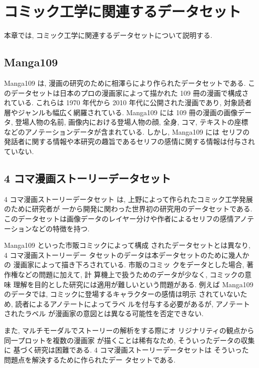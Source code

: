 \newpage
\changeindent{0cm}
\section{コミック工学に関連するデータセット}
\changeindent{2cm}

本章では, コミック工学に関連するデータセットについて説明する.

\changeindent{0cm}
\subsection{Manga109}
\changeindent{2cm}

Manga109 \cite{mtap_matsui_2017} は,
漫画の研究のために相澤らにより作られたデータセットである. このデータセットは日本のプロの漫画家によって描かれた 109 冊の漫画で構成されている. これらは 1970 年代から 2010 年代に公開された漫画であり, 対象読者層やジャンルも幅広く網羅されている. Manga109 には 109 冊の漫画の画像データ, 登場人物の名前, 画像内における登場人物の顔, 全身, コマ, テキストの座標などのアノテーションデータが含まれている.
しかし, Manga109 には
セリフの発話者に関する情報や本研究の趣旨であるセリフの感情に関する情報は付与されていない.

\changeindent{0cm}
\subsection{4 コマ漫画ストーリーデータセット}
\changeindent{2cm}

4 コマ漫画ストーリーデータセット \cite{ueno_miki2018} は, 上野によって作られたコミック工学発展のために研究者が
一から開発に関わった世界初の研究用のデータセットである. このデータセットは画像データのレイヤー分けや作者によるセリフの感情アノテーションなどの特徴を持つ.

Manga109 といった市販コミックによって構成
されたデータセットとは異なり, 4 コマ漫画ストーリーデー
タセットのデータは本データセットのために幾人かの
漫画家によって描き下ろされている. 市販のコミッ
クをデータとした場合, 著作権などの問題に加えて, 計
算機上で扱うためのデータが少なく, コミックの意味
理解を目的とした研究には適用が難しいという問題がある.
例えば Manga109 のデータでは, コミックに登場するキャラクターの感情は明示
されていないため, 読者によるアノテートによってラベ
ルを付与する必要があるが, アノテートされたラベル
が漫画家の意図とは異なる可能性を否定できない.

\newpage
また, マルチモーダルでストーリーの解析をする際にオ
リジナリティの観点から同一プロットを複数の漫画家
が描くことは稀有なため, そういったデータの収集に
基づく研究は困難である. 4 コマ漫画ストーリーデータセットは
そういった問題点を解決するために作られたデー
タセットである.

